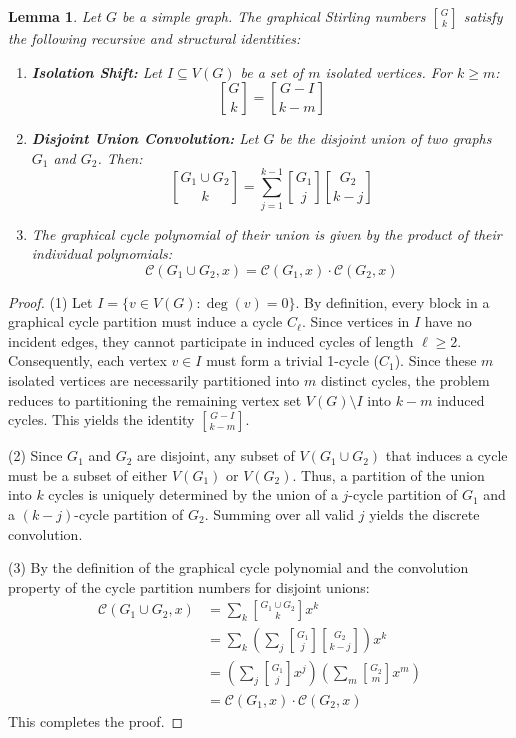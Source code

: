 \documentclass{amsart}
\newtheorem{lemma}[theorem]{Lemma}
\theoremstyle{definition}
\begin{document}
\begin{lemma}\label{lem:properties}
Let $G$ be a simple graph. The graphical Stirling numbers ${G \brack k}$ satisfy the following recursive and structural identities:
\begin{enumerate}
    \item \textbf{Isolation Shift:} Let $I \subseteq V(G)$ be a set of $m$ isolated vertices. For $k \geq m$:
    \begin{equation*}
        {G \brack k} = {G - I \brack k - m}
    \end{equation*}
    
    \item \textbf{Disjoint Union Convolution:} Let $G$ be the disjoint union of two graphs $G_1$ and $G_2$. Then:
    \begin{equation*}
        {G_1 \cup G_2 \brack k} = \sum_{j=1}^{k-1} {G_1 \brack j} {G_2 \brack k - j}
    \end{equation*}
      \item
   The graphical cycle polynomial of their union is given by the product of their individual polynomials:
\begin{equation*}
    \mathcal{C}(G_1 \cup G_2, x) = \mathcal{C}(G_1, x) \cdot \mathcal{C}(G_2, x)
\end{equation*}
\end{enumerate}
\end{lemma}

\begin{proof}
(1) Let $I = \{v \in V(G) : \deg(v) = 0\}$. By definition, every block in a graphical cycle partition must induce a cycle $C_{\ell}$. Since vertices in $I$ have no incident edges, they cannot participate in induced cycles of length $\ell \geq 2$. Consequently, each vertex $v \in I$ must form a trivial 1-cycle ($C_1$). Since these $m$ isolated vertices are necessarily partitioned into $m$ distinct cycles, the problem reduces to partitioning the remaining vertex set $V(G) \setminus I$ into $k - m$ induced cycles. This yields the identity ${G - I \brack k - m}$.

(2) Since $G_1$ and $G_2$ are disjoint, any subset of $V(G_1 \cup G_2)$ that induces a cycle must be a subset of either $V(G_1)$ or $V(G_2)$. Thus, a partition of the union into $k$ cycles is uniquely determined by the union of a $j$-cycle partition of $G_1$ and a $(k-j)$-cycle partition of $G_2$. Summing over all valid $j$ yields the discrete convolution.

(3)  By the definition of the graphical cycle polynomial and the convolution property of the cycle partition numbers for disjoint unions:
\begin{align*}
    \mathcal{C}(G_1 \cup G_2, x) &= \sum_{k} {G_1 \cup G_2 \brack k} x^k \\
    &= \sum_{k} \left( \sum_{j} {G_1 \brack j} {G_2 \brack k-j} \right) x^k \\
    &= \left( \sum_{j} {G_1 \brack j} x^j \right) \left( \sum_{m} {G_2 \brack m} x^m \right) \\
    &= \mathcal{C}(G_1, x) \cdot \mathcal{C}(G_2, x)
\end{align*}
This completes the proof.
\end{proof}
\end{document}
